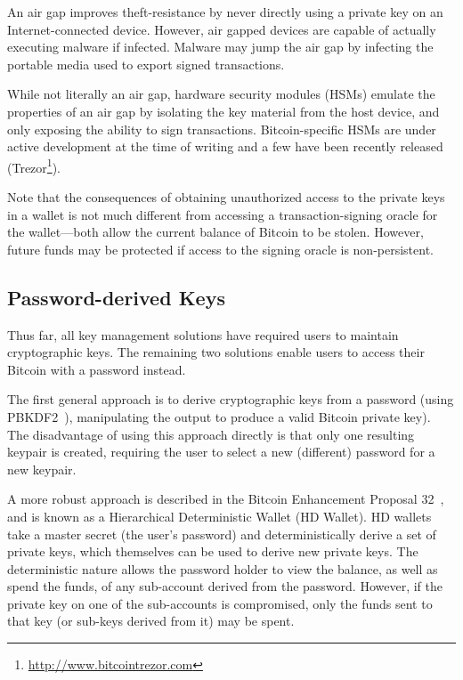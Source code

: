 An air gap improves theft-resistance by never directly using a private key on an Internet-connected device. However, air gapped devices are capable of actually executing malware if infected. Malware may jump the air gap by infecting the portable media used to export signed transactions.

While not literally an air gap, hardware security modules (HSMs) emulate the properties of an air gap by isolating the key material from the host device, and only exposing the ability to sign transactions. Bitcoin-specific HSMs are under active development at the time of writing and a few have been recently released (\eg Trezor\footnote{\url{http://www.bitcointrezor.com}}).

Note that the consequences of obtaining unauthorized access to the private keys in a wallet is not much different from accessing a transaction-signing oracle for the wallet---both allow the current balance of Bitcoin to be stolen. However, future funds may be protected if access to the signing oracle is non-persistent. 


\subsection{Password-derived Keys} 
Thus far, all key management solutions have required users to maintain cryptographic keys. The remaining two solutions enable users to access their Bitcoin with a password instead. 

The first general approach is to derive cryptographic keys from a password (\eg using PBKDF2~\cite{pbkdf2}), manipulating the output to produce a valid Bitcoin private key). The disadvantage of using this approach directly is that only one resulting keypair is created, requiring the user to select a new (different) password for a new keypair. 

A more robust approach is described in the Bitcoin Enhancement Proposal 32~\cite{bip32}, and is known as a Hierarchical Deterministic Wallet (HD Wallet). HD wallets take a master secret (the user's password) and deterministically derive a set of private keys, which themselves can be used to derive new private keys. The deterministic nature allows the password holder to view the balance, as well as spend the funds, of any sub-account derived from the password. However, if the private key on one of the sub-accounts is compromised, only the funds sent to that key (or sub-keys derived from it) may be spent. 


